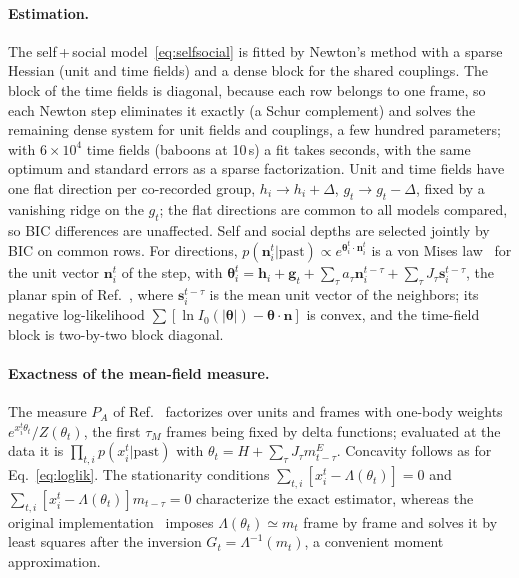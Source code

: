 \paragraph{Estimation.} The self\,+\,social model~\eqref{eq:selfsocial} is fitted by Newton's method with a sparse Hessian (unit and time fields) and a dense block for the shared couplings. The block of the time fields is diagonal, because each row belongs to one frame, so each Newton step eliminates it exactly (a Schur complement) and solves the remaining dense system for unit fields and couplings, a few hundred parameters; with $6\times10^4$ time fields (baboons at 10\,s) a fit takes seconds, with the same optimum and standard errors as a sparse factorization. Unit and time fields have one flat direction per co-recorded group, $h_i\to h_i+\Delta$, $g_t\to g_t-\Delta$, fixed by a vanishing ridge on the $g_t$; the flat directions are common to all models compared, so BIC differences are unaffected. Self and social depths are selected jointly by BIC on common rows. For directions, $p(\bm n_i^t|\text{past})\propto e^{\bm\theta_i^t\cdot\bm n_i^t}$ is a von Mises law~\cite{MardiaJupp2000} for the unit vector $\bm n_i^t$ of the step, with $\bm\theta_i^t=\mathbf h_i+\mathbf g_t+\sum_\tau a_\tau\bm n_i^{t-\tau}+\sum_\tau J_\tau\bm s_i^{t-\tau}$, the planar spin of Ref.~\cite{Agliari2024}, where $\bm s_i^{t-\tau}$ is the mean unit vector of the neighbors; its negative log-likelihood $\sum[\ln I_0(|\bm\theta|)-\bm\theta\cdot\bm n]$ is convex, and the time-field block is two-by-two block diagonal.

\paragraph{Exactness of the mean-field measure.} The measure $P_A$ of Ref.~\cite{Agliari2024} factorizes over units and frames with one-body weights $e^{x_i^t\theta_t}/Z(\theta_t)$, the first $\tau_M$ frames being fixed by delta functions; evaluated at the data it is $\prod_{t,i}p(x_i^t|\text{past})$ with $\theta_t=H+\sum_\tau J_\tau m^E_{t-\tau}$. Concavity follows as for Eq.~\eqref{eq:loglik}. The stationarity conditions $\sum_{t,i}[x_i^t-\Lambda(\theta_t)]=0$ and $\sum_{t,i}[x_i^t-\Lambda(\theta_t)]m_{t-\tau}=0$ characterize the exact estimator, whereas the original implementation~\cite{Agliari2024} imposes $\Lambda(\theta_t)\simeq m_t$ frame by frame and solves it by least squares after the inversion $G_t=\Lambda^{-1}(m_t)$, a convenient moment approximation.

